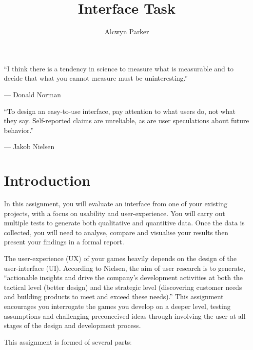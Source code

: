\documentclass{../../fal_assignment}
\title{Interface Task}
\author{Alcwyn Parker}
\begin{document}
\maketitle

\begin{marginquote}
    ``I think there is a tendency in science to measure what is measurable and to decide that what you cannot measure must be uninteresting.''
    
    --- Donald Norman
    
    \marginquoterule
    
    ``To design an easy-to-use interface, pay attention to what users do, not what they say. Self-reported claims are unreliable, as are user speculations about future behavior.''
    
    --- Jakob Nielsen
\end{marginquote}

\section*{Introduction}

In this assignment, you will evaluate an interface from one of your existing projects, with a focus on usability and user-experience. You will carry out multiple tests to generate both qualitative and quantitive data. Once the data is collected, you will need to analyse, compare and visualise your results then present your findings in a formal report.

The user-experience (UX) of your games heavily depends on the design of the user-interface (UI). According to Nielsen, the aim of user research is to generate, ``actionable insights and drive the company's development activities at both the tactical level (better design) and the strategic level (discovering customer needs and building products to meet and exceed these needs).'' This assignment encourages you interrogate the games you develop on a deeper level, testing assumptions and challenging preconceived ideas through involving the user at all stages of the design and development process. 

This assignment is formed of several parts:
\end{document}
